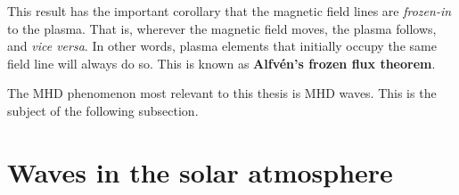 \documentclass[12pt]{../style-files/ociamthesis}
\begin{document}
This result has the important corollary that the magnetic field lines are \textit{frozen-in} to the plasma. That is, wherever the magnetic field moves, the plasma follows, and \textit{vice versa}. In other words, plasma elements that initially occupy the same field line will always do so. This is known as \textbf{Alfv\'{e}n's frozen flux theorem}.

The MHD phenomenon most relevant to this thesis is MHD waves. This is the subject of the following subsection.


\section{Waves in the solar atmosphere}
\label{sec: waves}
\end{document}
